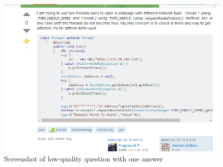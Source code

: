 \documentclass[12pt]{report}
\begin{document}
\begin{figure}[ht]
  \centering
  \includegraphics[width=1\textwidth]{Problem10_5/LowQuality.png}
  \caption{Screenshot of low-quality question with one answer}
  \label{fig:1}
\end{figure} 
\end{document}
